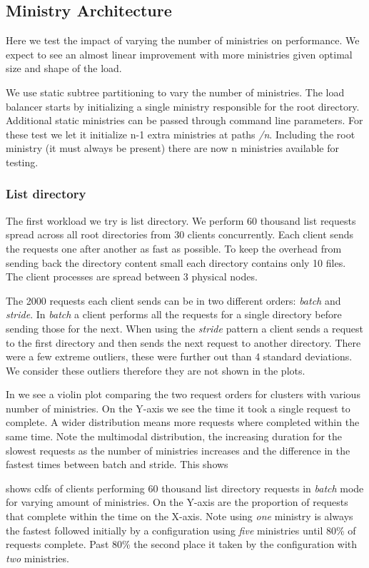 \subsection{Ministry Architecture} \label{sec:res_arg}
Here we test the impact of varying the number of ministries on performance. We expect to see an almost linear improvement with more ministries given optimal size and shape of the load.

We use static subtree partitioning to vary the number of ministries. The load balancer starts by initializing a single ministry responsible for the root directory. Additional static ministries can be passed through command line parameters. For these test we let it initialize n-1 extra ministries at paths \textsl{/n}. Including the root ministry (it must always be present) there are now n ministries available for testing.

\subsubsection*{List directory}
The first workload we try is list directory. We perform 60 thousand list requests spread across all root directories from 30 clients concurrently. Each client sends the requests one after another as fast as possible. To keep the overhead from sending back the directory content small each directory contains only 10 files. The client processes are spread between 3 physical nodes.

The 2000 requests each client sends can be in two different orders: \textit{batch} and \textit{stride}. In \textit{batch} a client performs all the requests for a single directory before sending those for the next. When using the \textit{stride} pattern a client sends a request to the first directory and then sends the next request to another directory. There were a few extreme outliers, these were further out than 4 standard deviations. We consider these outliers therefore they are not shown in the plots. 

In  we see a violin plot comparing the two request orders for clusters with various number of ministries. On the Y-axis we see the time it took a single request to complete. A wider distribution means more requests where completed within the same time. Note the multimodal distribution, the increasing duration for the slowest requests as the number of ministries increases and the difference in the fastest times between batch and stride. This shows 

 shows \acp{cdf} of clients performing 60 thousand list directory requests in \textit{batch} mode for varying amount of ministries. On the Y-axis are the proportion of requests that complete within the time on the X-axis. Note using \textit{one} ministry is always the fastest followed initially by a configuration using \textit{five} ministries until 80\% of requests complete. Past 80\% the second place it taken by the configuration with \textit{two} ministries.

